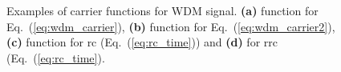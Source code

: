 \begin{figure}[tpb]
    \begin{minipage}[h]{0.3\linewidth}
    \end{minipage}
    \hfill
    \begin{minipage}[h]{0.55\linewidth}
    \end{minipage}
    \caption{Examples of carrier functions for WDM signal. \textbf{(a)} function for Eq.~(\ref{eq:wdm_carrier}), \textbf{(b)} function for Eq.~(\ref{eq:wdm_carrier2}), \textbf{(c)} function for \gls{rc} (Eq.~(\ref{eq:rc_time})) and \textbf{(d)} for \gls{rrc} (Eq.~(\ref{eq:rc_time}).}
    \label{fig:f_shapes}
\end{figure}


